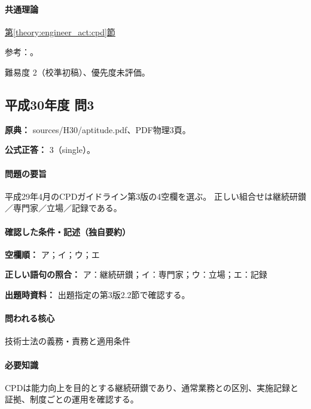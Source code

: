 \paragraph{共通理論} \hyperref[theory:engineer_act:cpd]{第\ref*{theory:engineer_act:cpd}節}

\par 参考：\cite{cpd_v2}。

\par 難易度 2（校準初稿）、優先度未評価。

\subsection{平成30年度 問3}
\label{q:h30-reg-apt-03}

\noindent\textbf{原典：} sources/H30/aptitude.pdf、PDF物理3頁。

\textbf{公式正答：} 3（single）。

\paragraph{問題の要旨} 平成29年4月のCPDガイドライン第3版の4空欄を選ぶ。 正しい組合せは継続研鑚／専門家／立場／記録である。

\paragraph{確認した条件・記述（独自要約）}\mbox{}\par

\noindent\textbf{空欄順：} ア；イ；ウ；エ\par

\noindent\textbf{正しい語句の照合：} ア：継続研鑚；イ：専門家；ウ：立場；エ：記録\par

\noindent\textbf{出題時資料：} 出題指定の第3版2.2節で確認する。\par

\paragraph{問われる核心} 技術士法の義務・責務と適用条件

\paragraph{必要知識} CPDは能力向上を目的とする継続研鑚であり、通常業務との区別、実施記録と証拠、制度ごとの運用を確認する。

